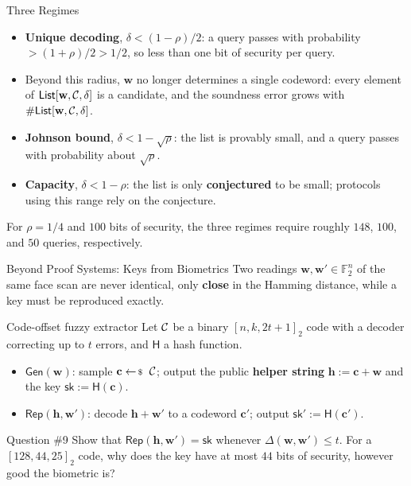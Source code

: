 \documentclass{zkdl-presentation-template}
\begin{document}
    \begin{frame}{Three Regimes}
        \begin{itemize}
            \item \textbf{Unique decoding}, $\delta < (1-\rho)/2$: a query passes with probability $> (1+\rho)/2 > 1/2$, so less than one bit of security per query.\pause
            \item Beyond this radius, $\mathbf{w}$ no longer determines a single codeword: every element of $\mathsf{List}[\mathbf{w}, \mathcal{C}, \delta]$ is a candidate, and the soundness error grows with $\#\mathsf{List}[\mathbf{w}, \mathcal{C}, \delta]$.\pause
            \item \textbf{Johnson bound}, $\delta < 1 - \sqrt{\rho}$: the list is provably small, and a query passes with probability about $\sqrt{\rho}$.\pause
            \item \textbf{Capacity}, $\delta < 1 - \rho$: the list is only \textbf{conjectured} to be small; protocols using this range rely on the conjecture.
        \end{itemize}
        \pause

        \begin{example}
            For $\rho = 1/4$ and $100$ bits of security, the three regimes require roughly $148$, $100$, and $50$ queries, respectively.
        \end{example}
    \end{frame}

    \begin{frame}{Beyond Proof Systems: Keys from Biometrics}
        Two readings $\mathbf{w}, \mathbf{w}' \in \mathbb{F}_2^n$ of the same face scan are never identical, only \textbf{close} in the Hamming distance, while a key must be reproduced exactly.
        \pause

        \begin{block}{Code-offset fuzzy extractor}
            Let $\mathcal{C}$ be a binary $[n, k, 2t+1]_2$ code with a decoder correcting up to $t$ errors, and $\mathsf{H}$ a hash function.
            \begin{itemize}
                \item $\mathsf{Gen}(\mathbf{w})$: sample $\mathbf{c} \leftarrowS \code$; output the public \textbf{helper string} $\mathbf{h} := \mathbf{c} + \mathbf{w}$ and the key $\mathsf{sk} := \mathsf{H}(\mathbf{c})$.
                \item $\mathsf{Rep}(\mathbf{h}, \mathbf{w}')$: decode $\mathbf{h} + \mathbf{w}'$ to a codeword $\mathbf{c}'$; output $\mathsf{sk}' := \mathsf{H}(\mathbf{c}')$.
            \end{itemize}
        \end{block}
        \pause

        \begin{questionblock}{Question \#9}
            Show that $\mathsf{Rep}(\mathbf{h}, \mathbf{w}') = \mathsf{sk}$ whenever $\Delta(\mathbf{w}, \mathbf{w}') \leq t$. For a $[128, 44, 25]_2$ code, why does the key have at most $44$ bits of security, however good the biometric is?
        \end{questionblock}
    \end{frame}
\end{document}
